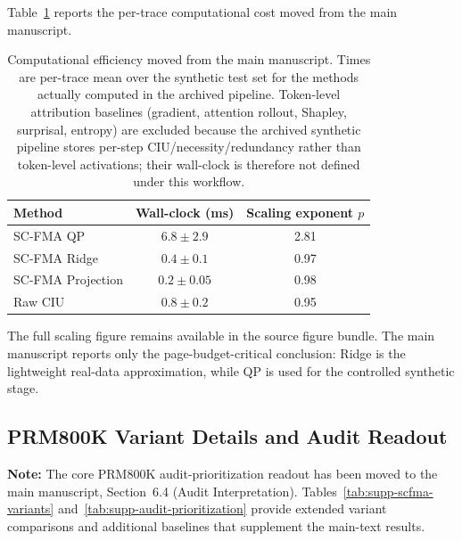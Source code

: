 \documentclass[a4paper,fleqn]{cas-sc}
\begin{document}
Table~\ref{tab:supp-efficiency} reports the per-trace computational cost moved from the main manuscript.

\begin{table}[ht]
\caption{Computational efficiency moved from the main manuscript. Times are per-trace mean over the synthetic test set for the methods actually computed in the archived pipeline. Token-level attribution baselines (gradient, attention rollout, Shapley, surprisal, entropy) are excluded because the archived synthetic pipeline stores per-step CIU/necessity/redundancy rather than token-level activations; their wall-clock is therefore not defined under this workflow.}
\label{tab:supp-efficiency}
\centering
\small
\begin{tabular}{lcc}
\toprule
\textbf{Method} & \textbf{Wall-clock (ms)} & \textbf{Scaling exponent $p$} \\
\midrule
SC-FMA QP & $6.8 \pm 2.9$ & 2.81 \\
SC-FMA Ridge & $0.4 \pm 0.1$ & 0.97 \\
SC-FMA Projection & $0.2 \pm 0.05$ & 0.98 \\
Raw CIU & $0.8 \pm 0.2$ & 0.95 \\
\bottomrule
\end{tabular}
\end{table}

The full scaling figure remains available in the source figure bundle. The main manuscript reports only the page-budget-critical conclusion: Ridge is the lightweight real-data approximation, while QP is used for the controlled synthetic stage.

\subsection{PRM800K Variant Details and Audit Readout}
\label{app:prm800k-variant-details}

\noindent\textbf{Note:} The core PRM800K audit-prioritization readout has been moved to the main manuscript, Section~6.4 (Audit Interpretation). Tables~\ref{tab:supp-scfma-variants} and~\ref{tab:supp-audit-prioritization} provide extended variant comparisons and additional baselines that supplement the main-text results.
\end{document}
